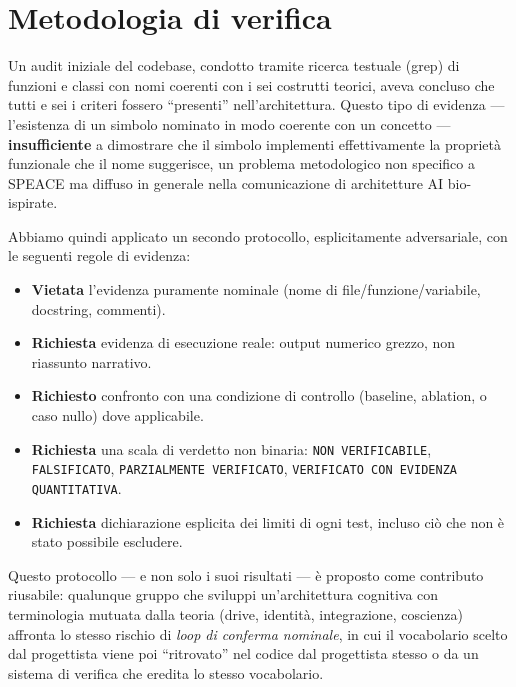 \documentclass[11pt,a4paper]{article}
\newcommand{\code}[1]{\texttt{#1}}
\begin{document}
\section{Metodologia di verifica}
\label{sec:method}

Un audit iniziale del codebase, condotto tramite ricerca testuale (grep) di funzioni e classi con nomi coerenti con i sei costrutti teorici, aveva concluso che tutti e sei i criteri fossero ``presenti'' nell'architettura. Questo tipo di evidenza --- l'esistenza di un simbolo nominato in modo coerente con un concetto --- \textbf{insufficiente} a dimostrare che il simbolo implementi effettivamente la propriet\`a funzionale che il nome suggerisce, un problema metodologico non specifico a SPEACE ma diffuso in generale nella comunicazione di architetture AI bio-ispirate.

Abbiamo quindi applicato un secondo protocollo, esplicitamente adversariale, con le seguenti regole di evidenza:

\begin{itemize}
  \item \textbf{Vietata} l'evidenza puramente nominale (nome di file/funzione/variabile, docstring, commenti).
  \item \textbf{Richiesta} evidenza di esecuzione reale: output numerico grezzo, non riassunto narrativo.
  \item \textbf{Richiesto} confronto con una condizione di controllo (baseline, ablation, o caso nullo) dove applicabile.
  \item \textbf{Richiesta} una scala di verdetto non binaria: \code{NON VERIFICABILE}, \code{FALSIFICATO}, \code{PARZIALMENTE VERIFICATO}, \code{VERIFICATO CON EVIDENZA QUANTITATIVA}.
  \item \textbf{Richiesta} dichiarazione esplicita dei limiti di ogni test, incluso ci\`o che non \`e stato possibile escludere.
\end{itemize}

Questo protocollo --- e non solo i suoi risultati --- \`e proposto come contributo riusabile: qualunque gruppo che sviluppi un'architettura cognitiva con terminologia mutuata dalla teoria (drive, identit\`a, integrazione, coscienza) affronta lo stesso rischio di \emph{loop di conferma nominale}, in cui il vocabolario scelto dal progettista viene poi ``ritrovato'' nel codice dal progettista stesso o da un sistema di verifica che eredita lo stesso vocabolario.
\end{document}
